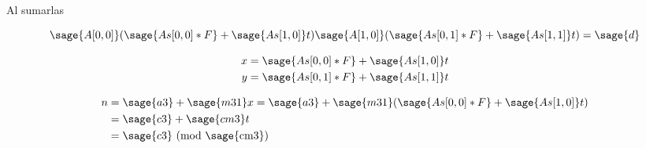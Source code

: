 \documentclass{amsart}
\begin{document}
Al sumarlas

$$
	\sage{A[0, 0]} (\sage{As[0, 0] * F} + \sage{As[1, 0]} t)  \sage{A[1, 0]} (\sage{As[0, 1] * F} + \sage{As[1, 1]} t) = \sage{d}
$$

\begin{align*}
	x &= \sage{As[0, 0] * F} + \sage{As[1, 0]} t \\
	y &= \sage{As[0, 1] * F} + \sage{As[1, 1]} t \\
\end{align*}

\begin{align*}
	n &= \sage{a3} + \sage{m31} x = \sage{a3} + \sage{m31} (\sage{As[0, 0] * F} + \sage{As[1, 0]} t) \\
	&= \sage{c3} + \sage{cm3} t \\
	&= \sage{c3} \text{ (mod \sage{cm3})}
\end{align*}

\end{document}
